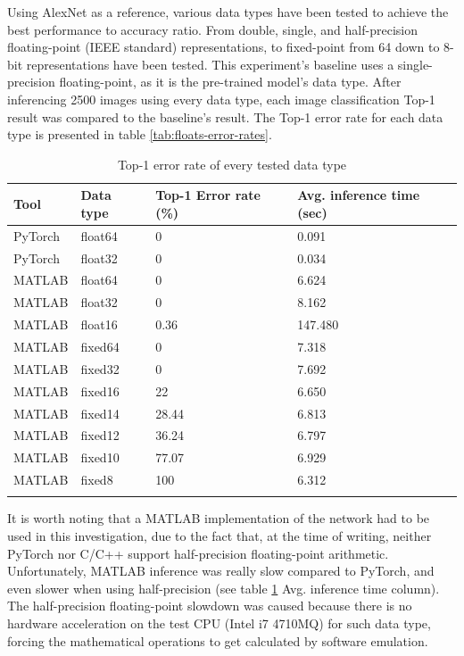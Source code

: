 Using AlexNet as a reference, various data types have been tested to achieve the best performance to accuracy ratio. From double, single, and half-precision floating-point (IEEE standard) representations, to fixed-point from 64 down to 8-bit representations have been tested. This experiment's baseline uses a single-precision floating-point, as it is the pre-trained model's data type. After inferencing 2500 images using every data type, each image classification Top-1 result was compared to the baseline's result. The Top-1 error rate for each data type is presented in table \ref{tab:floats-error-rates}.

\begin{table}[H]
	\caption{Top-1 error rate of every tested data type}
	\label{tab:floats-fixed-error-rates}
	\centering
	\begin{tabular}{p{2cm} p{2cm} p{3cm} p{3cm}}
		\toprule
		\textbf{Tool} & \textbf{Data type} & \textbf{Top-1 Error rate (\%)} & \textbf{Avg. inference time (sec)} \\
		\midrule
			PyTorch & float64	& 0			& 0.091 \\
			PyTorch & float32	& 0			& 0.034 \\
			MATLAB 	& float64	& 0			& 6.624 \\
			MATLAB 	& float32	& 0			& 8.162 \\
			MATLAB 	& float16 	& 0.36  	& 147.480 \\
		\midrule
			MATLAB 	& fixed64	& 0 		& 7.318 \\
			MATLAB 	& fixed32	& 0 		& 7.692 \\
			MATLAB 	& fixed16	& 22 		& 6.650 \\
			MATLAB 	& fixed14	& 28.44 	& 6.813 \\
			MATLAB 	& fixed12	& 36.24 	& 6.797 \\
			MATLAB 	& fixed10	& 77.07		& 6.929 \\
			MATLAB 	& fixed8	& 100 		& 6.312 \\
		\bottomrule\\
	\end{tabular}
\end{table}

It is worth noting that a MATLAB implementation of the network had to be used in this investigation, due to the fact that, at the time of writing, neither PyTorch nor C/C++ support half-precision floating-point arithmetic. Unfortunately, MATLAB inference was really slow compared to PyTorch, and even slower when using half-precision (see table \ref{tab:floats-fixed-error-rates} Avg. inference time column). The half-precision floating-point slowdown was caused because there is no hardware acceleration on the test CPU (Intel i7 4710MQ) for such data type, forcing the mathematical operations to get calculated by software emulation.

